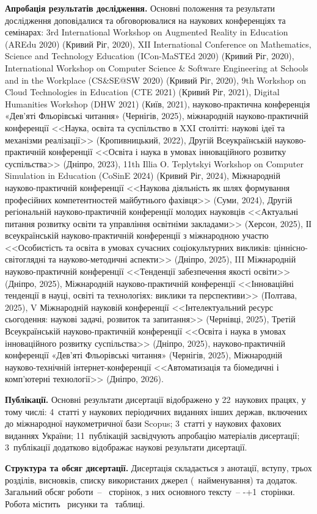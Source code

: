 \textbf{Апробація результатів дослідження.} Основні положення та результати дослідження доповідалися та обговорювалися на наукових конференціях та семінарах:
3rd International Workshop on Augmented Reality in Education (AREdu 2020) (Кривий Ріг, 2020),
XII International Conference on Mathematics, Science and Technology Education (ICon-MaSTEd 2020) (Кривий Ріг, 2020),
International Workshop on Computer Science \& Software Engineering at Schools and in the Workplace (CS\&SE@SW 2020) (Кривий Ріг, 2020),
9th Workshop on Cloud Technologies in Education (CTE 2021) (Кривий Ріг, 2021),
Digital Humanities Workshop (DHW 2021) (Київ, 2021),
науково-практична конференція «Дев’яті Фльорівські читання» (Чернігів, 2025),
міжнародній науково-практичній конференції <<Наука, освіта та суспільство в XXI столітті: наукові ідеї та механізми реалізації>> (Кропивницький,
2022),
Другій Всеукраїнській науково-практичній конференції <<Освіта і наука в умовах інноваційного розвитку суспільства>> (Дніпро, 2023),
11th Illia O. Teplytskyi Workshop on Computer Simulation in Education (CoSinE 2024) (Кривий Ріг, 2024), 
Міжнародній науково-практичній конференції <<Наукова діяльність як шлях формування професійних компетентностей майбутнього фахівця>> (Суми, 2024),
Другій регіональній науково-практичній конференції молодих науковців <<Актуальні питання розвитку освіти та управління освітніми закладами>> (Херсон, 2025),
ІІ всеукраїнській науково-практичній конференції з міжнародною
участю <<Особистість та освіта в умовах сучасних соціокультурних викликів:
ціннісно-світоглядні та науково-методичні аспекти>> (Дніпро, 2025),
III Міжнародній науково-практичній
конференції <<Тенденції забезпечення якості освіти>>  (Дніпро, 2025),
Міжнародній науково-практичній конференції <<Інноваційні тенденції в науці, освіті та технологіях: виклики та перспективи>> (Полтава, 2025),
V Міжнародній науковій конференції <<Інтелектуальний ресурс сьогодення: наукові задачі, розвиток та  запитання>> (Чернівці, 2025),
Третій Всеукраїнській науково-практичній конференції <<Освіта і наука в умовах інноваційного розвитку суспільства>> (Дніпро, 2025),
науково-практичній конференції «Дев’яті Фльорівські
читання» (Чернігів, 2025),
Міжнародній науково-технічній інтернет-конференції <<Автоматизація та біомедичні і комп’ютерні технології>>
(Дніпро, 2026).


\textbf{Публікації.} Основні результати дисертації відображено у 22~наукових працях, у тому числі: 4~статті у наукових періодичних виданнях інших держав, включених до міжнародної наукометричної бази Scopus; 3~статті у наукових фахових виданнях України; 11~публікацій засвідчують апробацію матеріалів дисертації; 3~публікації додатково відображає наукові результати дисертації.

\textbf{Структура та обсяг дисертації.} Дисертація складається з анотації, вступу, трьох розділів, висновків, списку використаних джерел (~найменування) та додаток. Загальний обсяг роботи~--  \the\numexpr{}\relax~сторінок, з них основного тексту~-- \the\numexpr{}-+1\relax~сторінки. Робота містить \totalfigures~рисунки та \totaltables~таблиці.
